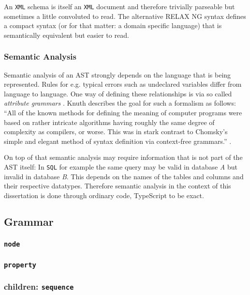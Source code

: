 An \texttt{XML} schema is itself an \texttt{XML} document and therefore trivially parseable but sometimes a little convoluted to read. The alternative RELAX NG syntax defines a compact syntax (or for that matter: a domain specific language) that is semantically equivalent but easier to read.

\subsubsection{Semantic Analysis}

Semantic analysis of an AST strongly depends on the language that is being represented. Rules for e.g. typical errors such as undeclared variables differ from language to language. One way of defining these relationships is via so called \textit{attribute grammars} \cite{knuth_semantics_1968}. Knuth describes the goal for such a formalism as follows: \enquote{All of the known methods for defining the meaning of computer programs were
based on rather intricate algorithms having roughly the same degree of complexity as
compilers, or worse. This was in stark contrast to Chomsky’s simple and elegant method
of syntax definition via context-free grammars.} \cite{knuth_genesis_1990}.

On top of that semantic analysis may require information that is not part of the AST itself: In \texttt{SQL} for example the same query may be valid in database \textit{A} but invalid in database \textit{B}. This depends on the names of the tables and columns and their respective datatypes. Therefore semantic analysis in the context of this dissertation is done through ordinary code, TypeScript to be exact.



\subsection{Grammar}

\subsubsection{\texttt{node}}

\subsubsection{\texttt{property}}

\subsubsection{children: \texttt{sequence}}

